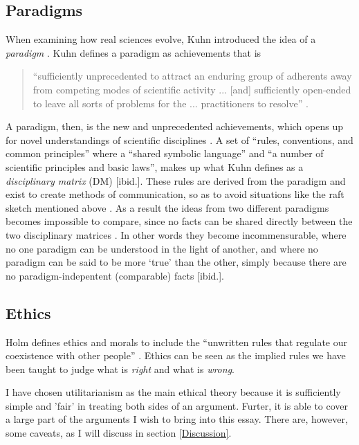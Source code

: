 \documentclass{article}
\begin{document}
\subsection{Paradigms} \label{Theory:Paradigms}
When examining how real sciences evolve, Kuhn introduced the idea of a \textit{paradigm} \citep[p. 59]{Holm:2014}. Kuhn defines a paradigm as achievements that is
\begin{quote}
``sufficiently unprecedented to attract an enduring group of adherents away from competing modes of scientific activity ... [and] sufficiently open-ended to leave all sorts of problems for the ... practitioners to resolve'' \citep[p. 10-11]{Kuhn:2012}.
\end{quote}
A paradigm, then, is the new and unprecedented achievements, which opens up for novel understandings of scientific disciplines \citep[p. 61]{Holm:2014}. A set of ``rules, conventions, and common principles'' where a ``shared symbolic language'' and ``a number of scientific principles and basic laws'', makes up what Kuhn defines as a \textit{disciplinary matrix} (DM) [ibid.]. These rules are derived from the paradigm and exist to create methods of communication, so as to avoid situations like the raft sketch mentioned above \citep[p. 181]{Kuhn:2012}. As a result the ideas from two different paradigms becomes impossible to compare, since no facts can be shared directly between the two disciplinary matrices \citep[p. 66]{Holm:2014}. In other words they become incommensurable, where no one paradigm can be understood in the light of another, and where no paradigm can be said to be more `true' than the other, simply because there are no paradigm-indepentent (comparable) facts [ibid.].

\subsection{Ethics}
Holm defines ethics and morals to include the ``unwritten rules that regulate our coexistence with other people'' \citep[p. 205]{ibid.}. Ethics can be seen as the implied rules we have been taught to judge what is \textit{right} and what is \textit{wrong}.

I have chosen utilitarianism as the main ethical theory because it is sufficiently simple and 'fair' in treating both sides of an argument. Furter, it is able to cover a large part of the arguments I wish to bring into this essay. There are, however, some caveats, as I will discuss in section \ref{Discussion}.
\end{document}
